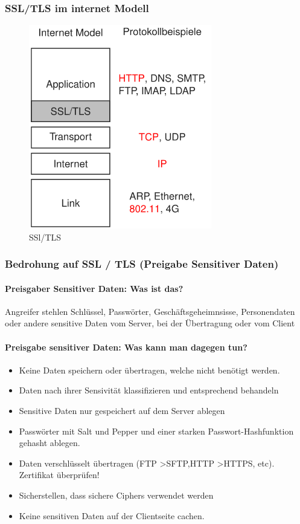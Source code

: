 \documentclass[10pt,a4paper]{article}
\begin{document}
\subsubsection*{SSL/TLS im internet Modell}
\begin{figure}[H]
    \begin{center}
    \includegraphics[width=8cm]{images/SSL-TLS.png}
    \caption{SSl/TLS}
    \label{SSL/TLS}
    \end{center}
\end{figure}

\subsubsection*{Bedrohung auf SSL / TLS (Preigabe Sensitiver Daten)}

\paragraph*{Preisgaber Sensitiver Daten: Was ist das?} Angreifer stehlen Schlüssel, Passwörter, Geschäftsgeheimnsisse,
Personendaten oder andere sensitive Daten vom Server, bei der Übertragung oder vom Client

\paragraph*{Preisgabe sensitiver Daten: Was kann man dagegen tun?}
\begin{itemize}[noitemsep,topsep=0pt,leftmargin=*]
    \item Keine Daten speichern oder übertragen, welche nicht benötigt werden.
    \item Daten nach ihrer Sensivität klassifizieren und entsprechend behandeln
    \item Sensitive Daten nur gespeichert auf dem Server ablegen
    \item Passwörter mit Salt und Pepper und einer starken Passwort-Hashfunktion gehasht ablegen.
    \item Daten verschlüsselt übertragen (FTP \textgreater SFTP,HTTP \textgreater HTTPS, etc). Zertifikat überprüfen!
    \item Sicherstellen, dass sichere Ciphers verwendet werden
    \item Keine sensitiven Daten auf der Clientseite cachen.
\end{itemize}
\end{document}
